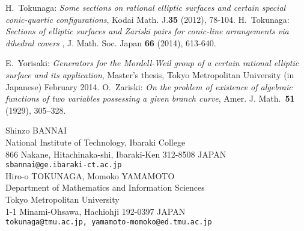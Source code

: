 \documentclass{article}
\begin{document}
\begin{thebibliography}{99}
%
 H.~Tokunaga: \emph{Some sections on rational elliptic surfaces and certain special
conic-quartic configurations}, Kodai Math. J.\textbf{35} (2012), 78-104.
%
%
 H.~Tokunaga: \emph{
Sections of elliptic surfaces 
and
 Zariski pairs for conic-line arrangements via dihedral covers
 }, J. Math. Soc. Japan {\bf 66} (2014), 613-640.
%

%
 E.~Yorisaki: \emph{Generators for the Mordell-Weil group of a certain rational elliptic surface and
its application}, Master's thesis,  Tokyo Metropolitan University (in Japanese) February 2014.
%
 O.~Zariski: 
\emph{On the problem of existence of algebraic functions of two variables possessing a 
given branch curve}, Amer. J. Math.~\textbf{51} (1929), 305--328.
%




\end{thebibliography}

\noindent Shinzo BANNAI\\
National Institute of Technology, Ibaraki College\\
866 Nakane, Hitachinaka-shi, Ibaraki-Ken 312-8508 JAPAN \\
{\tt sbannai@ge.ibaraki-ct.ac.jp}\\

\noindent Hiro-o TOKUNAGA, Momoko YAMAMOTO\\
Department of Mathematics and Information Sciences\\
Tokyo Metropolitan University\\
1-1 Minami-Ohsawa, Hachiohji 192-0397 JAPAN \\
{\tt tokunaga@tmu.ac.jp, yamamoto-momoko@ed.tmu.ac.jp}
%
%

{\tt }

\vspace{0.5cm}
      
%      
 
\end{document}
